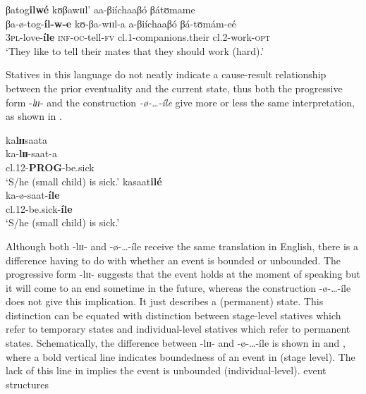 \documentclass[output=paper,newtxmath,modfonts,nonflat,draftmode]{langsci/langscibook}
\begin{document}
\ex 
    \glll   βatog\textbf{ilwé}          kʊβawɪɪl’       aa-βiíchaaβó    βátʊmame\\       
            βa-ø-tog-\textbf{íl-w-e}    kʊ-βa-wɪɪl-a    a-βiíchaaβó     βá-tʊmám-eé\\          
    3\textsc{pl}-love-\textbf{íle}       \textsc{inf}-\textsc{oc}-tell-\textsc{fv} cl.1-companions.their    cl.2-work-\textsc{opt}\\
  \glt ‘They like to tell their mates that they should work (hard).’
\z
\z

Statives in this language do not neatly indicate a cause-result relationship between the prior eventuality and the current state, thus both the progressive form -\textit{lɪɪ}- and the construction \textit{-ø}\textit{-…-íle} give more or less the same interpretation, as shown in . 

\ea \label{ex:kanijo:19}
\ea 
    \glll ka\textbf{l}\textbf{ɪɪ}saata\\   
    ka-\textbf{lɪɪ}-saat-a\\                              
     cl.12-\textbf{PROG}-be.sick\\            
    \glt `S/he (small child) is sick.’         
\ex 
\glll kasaat\textbf{ilé}\\
ka-ø-saat-\textbf{íle}\\
cl.12-be.sick-\textbf{íle}\\
\glt `S/he (small child) is sick.’ 
\z
\z

Although both -lɪɪ- and -ø-\ldots-íle receive the same translation in English, there is a difference having to do with whether an event is bounded or unbounded. The progressive form -lɪɪ- suggests that the event holds at the moment of speaking but it will come to an end sometime in the future, whereas the construction -ø-\ldots-íle does not give this implication. It just describes a (permanent) state. This distinction can be equated with  distinction between stage-level statives which refer to temporary states and individual-level statives which refer to permanent states. Schematically, the difference between -lɪɪ- and -ø-\ldots-íle is shown in  and , where a bold vertical line indicates boundedness of an event in  (stage level). The lack of this line in \textup{} implies the event is unbounded (individual-level). event structures 


\begin{figure}
\caption{\label{fig:kanijo:7}}
\end{figure}
\end{document}
